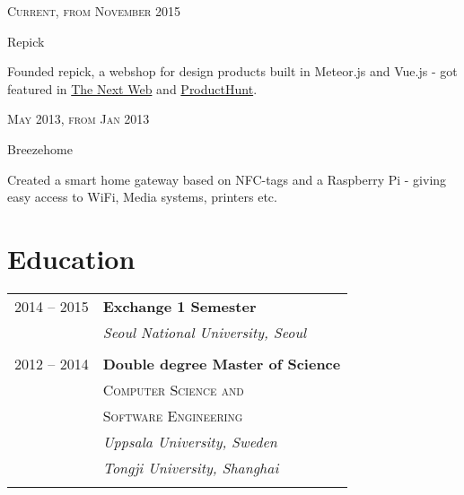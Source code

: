 \documentclass[10pt]{article} %
\begin{document}
{\begin{minipage}[t]{0.44\textwidth}

{\raggedleft\textsc{Current, from November 2015}\par}

{\raggedright\large Repick}

\normalsize{Founded repick, a webshop for design products built in Meteor.js and Vue.js - got featured in \href{https://thenextweb.com/creativity/2016/08/29/repick-beautiful-products/#.tnw_CczuDWJK}{The Next Web} and \href{https://www.producthunt.com/posts/repick}{ProductHunt}. }\\


{\raggedleft\textsc{May 2013, from Jan 2013}\par}

{\raggedright\large Breezehome}

\normalsize{Created a smart home gateway based on NFC-tags and a Raspberry Pi - giving easy access to WiFi, Media systems, printers etc.}\\


\section{Education}

\begin{tabular}{rl} %


2014 -- \textsc{2015} & \textbf{Exchange 1 Semester} \\
& \textit{Seoul National University, Seoul}\\
&\\


2012 -- \textsc{2014} & \textbf{Double degree Master of Science} \\
& \textsc{Computer Science and} \\
& \textsc{Software Engineering} \\
& \textit{Uppsala University, Sweden} \\
& \textit{Tongji University, Shanghai} \\
&\\


\end{tabular}
\end{minipage}}
\end{document}
